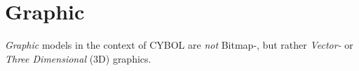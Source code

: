 %
%
%
%
%
%

\section{Graphic}
\label{graphic_heading}

\emph{Graphic} models in the context of CYBOL are \emph{not} Bitmap-, but
rather \emph{Vector-} or \emph{Three Dimensional} (3D) graphics.



